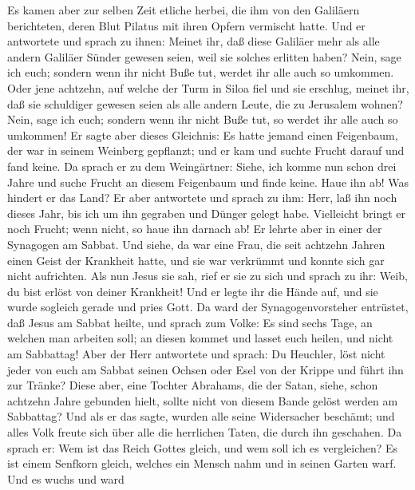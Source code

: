  Es kamen aber zur selben Zeit etliche herbei, die ihm von
den Galiläern berichteten, deren Blut Pilatus mit ihren Opfern vermischt
hatte.  Und er antwortete und sprach zu ihnen: Meinet ihr,
daß diese Galiläer mehr als alle andern Galiläer Sünder gewesen seien,
weil sie solches erlitten haben?  Nein, sage ich euch;
sondern wenn ihr nicht Buße tut, werdet ihr alle auch so umkommen.
 Oder jene achtzehn, auf welche der Turm in Siloa fiel und
sie erschlug, meinet ihr, daß sie schuldiger gewesen seien als alle
andern Leute, die zu Jerusalem wohnen?  Nein, sage ich
euch; sondern wenn ihr nicht Buße tut, so werdet ihr alle auch so
umkommen!  Er sagte aber dieses Gleichnis: Es hatte jemand
einen Feigenbaum, der war in seinem Weinberg gepflanzt; und er kam und
suchte Frucht darauf und fand keine.  Da sprach er zu dem
Weingärtner: Siehe, ich komme nun schon drei Jahre und suche Frucht an
diesem Feigenbaum und finde keine. Haue ihn ab! Was hindert er das Land?
 Er aber antwortete und sprach zu ihm: Herr, laß ihn noch
dieses Jahr, bis ich um ihn gegraben und Dünger gelegt habe.
 Vielleicht bringt er noch Frucht; wenn nicht, so haue ihn
darnach ab!  Er lehrte aber in einer der Synagogen am
Sabbat.  Und siehe, da war eine Frau, die seit achtzehn
Jahren einen Geist der Krankheit hatte, und sie war verkrümmt und konnte
sich gar nicht aufrichten.  Als nun Jesus sie sah, rief
er sie zu sich und sprach zu ihr: Weib, du bist erlöst von deiner
Krankheit!  Und er legte ihr die Hände auf, und sie wurde
sogleich gerade und pries Gott.  Da ward der
Synagogenvorsteher entrüstet, daß Jesus am Sabbat heilte, und sprach zum
Volke: Es sind sechs Tage, an welchen man arbeiten soll; an diesen
kommet und lasset euch heilen, und nicht am Sabbattag! 
Aber der Herr antwortete und sprach: Du Heuchler, löst nicht jeder von
euch am Sabbat seinen Ochsen oder Esel von der Krippe und führt ihn zur
Tränke?  Diese aber, eine Tochter Abrahams, die der
Satan, siehe, schon achtzehn Jahre gebunden hielt, sollte nicht von
diesem Bande gelöst werden am Sabbattag?  Und als er das
sagte, wurden alle seine Widersacher beschämt; und alles Volk freute
sich über alle die herrlichen Taten, die durch ihn geschahen.
 Da sprach er: Wem ist das Reich Gottes gleich, und wem
soll ich es vergleichen?  Es ist einem Senfkorn gleich,
welches ein Mensch nahm und in seinen Garten warf. Und es wuchs und ward
